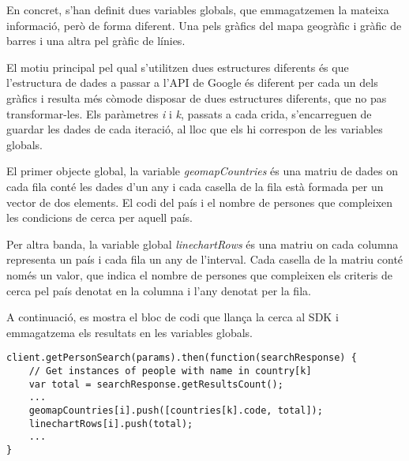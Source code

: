 En concret, s'han definit dues variables globals, que emmagatzemen la mateixa informació, però de forma diferent. Una pels gràfics del mapa geogràfic i gràfic de barres i una altra pel gràfic de línies.

El motiu principal pel qual s’utilitzen dues estructures diferents és que l'estructura de dades a passar a l’API de Google és diferent per cada un dels gràfics i resulta més còmode disposar de dues estructures diferents, que no pas transformar-les. Els paràmetres \emph{i} i \emph{k}, passats a cada crida, s’encarreguen de guardar les dades de cada iteració, al lloc que els hi correspon de les variables globals.

El primer objecte global, la variable \emph{geomapCountries} és una matriu de dades on cada fila conté les dades d'un any i cada casella de la fila està formada per un vector de dos elements. El codi del país i el nombre de persones que compleixen les condicions de cerca per aquell país.

Per altra banda, la variable global \emph{linechartRows} és una matriu on cada columna representa un país i cada fila un any de l'interval. Cada casella de la matriu conté només un valor, que indica el nombre de persones que compleixen els criteris de cerca pel país denotat en la columna i l’any denotat per la fila.

A continuació, es mostra el bloc de codi que llança la cerca al SDK i  emmagatzema els resultats en les variables globals.

\begin{lstlisting}[style=rawOwn,caption={Crida al SDK i actualització de variables globals}]
client.getPersonSearch(params).then(function(searchResponse) {
    // Get instances of people with name in country[k]
    var total = searchResponse.getResultsCount();
    ...
    geomapCountries[i].push([countries[k].code, total]);
    linechartRows[i].push(total);
    ...
}
\end{lstlisting}
